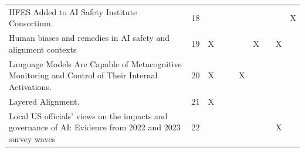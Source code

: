 \begin{landscape}
\begin{longtable}{|p{14cm}|c|c|c|c|c|c|c|c|c|}
		HFES Added to AI Safety Institute Consortium.                                                                                                           & 18          &                                    &                                                           &                                                       &                                                            &                                           &                                              &                                                    & X                                  \\
		Human biases and remedies in AI safety and alignment contexts                                                                                           & 19          & X                                  &                                                           &                                                       &                                                            & X                                         &                                              & X                                                  &                                    \\
		Language Models Are Capable of Metacognitive Monitoring and Control of Their Internal Activations.                                                      & 20          & X                                  &                                                           &                                                       & X                                                          &                                           &                                              &                                                    &                                    \\
		Layered Alignment.                                                                                                                                      & 21          & X                                  &                                                           &                                                       &                                                            &                                           &                                              &                                                    &                                    \\
		Local US officials' views on the impacts and governance of AI: Evidence from 2022 and 2023 survey waves                                                 & 22          &                                    &                                                           &                                                       &                                                            &                                           &                                              & X                                                  &                                    \\

\end{longtable}
\end{landscape}
